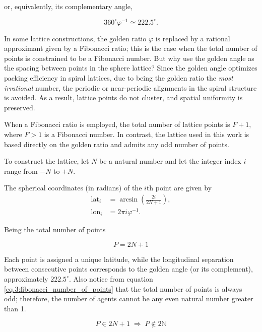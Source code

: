 or, equivalently, its complementary angle,

\begin{equation*}
  360^\circ \varphi^{-1} \simeq 222.5^\circ .
\end{equation*}

In some lattice constructions, the golden ratio $\varphi$ is replaced by a rational approximant given by a Fibonacci ratio; this is the case when the total number of points is constrained to be a Fibonacci number. But why use the golden angle as the spacing between points in the sphere lattice? Since the golden angle optimizes packing efficiency in spiral lattices, due to being the golden ratio the \emph{most irrational} number, the  periodic or near-periodic alignments in the spiral structure is avoided. As a result, lattice points do not cluster, and spatial uniformity is preserved.

When a Fibonacci ratio is employed, the total number of lattice points is $F + 1$, where $F > 1$ is a Fibonacci number. In contrast, the lattice used in this work is based directly on the golden ratio and admits any odd number of points.

To construct the lattice, let $N$ be a natural number and let the integer index $i$ range from $-N$ to $+N$. 

The spherical coordinates (in radians) of the $i$th point are given by
\begin{align}
\text{lat}_i &= \arcsin\!\left(\frac{2i}{2N + 1}\right), \\
\text{lon}_i &= 2\pi i \varphi^{-1} .
\label{eq:fibonacci_lat_lon}
\end{align}

Being the total number of points

\begin{equation}
P = 2N + 1 
\label{eq.3:fibonacci_number_of_points}
\end{equation}

Each point is assigned a unique latitude, while the longitudinal separation between consecutive points corresponds to the golden angle (or its complement), approximately $222.5^\circ$. Also notice from equation \ref{eq.3:fibonacci_number_of_points} that the total number of points is always odd; therefore, the number of agents cannot be any even natural number greater than 1.

\begin{equation*}
    P \in 2N + 1 \;\Rightarrow\; P \notin 2\mathbb{N}
\end{equation*}

